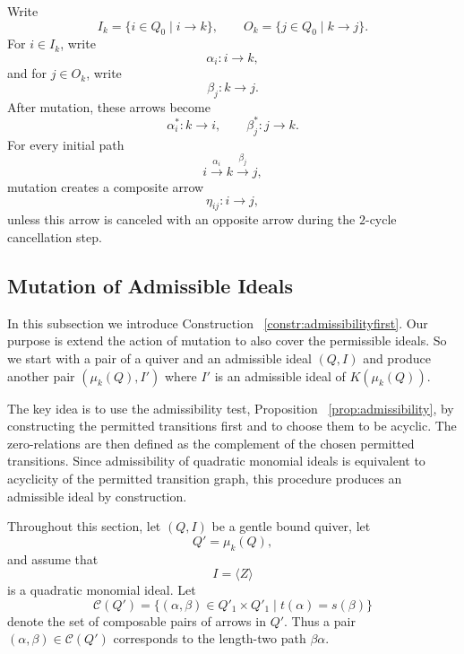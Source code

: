\documentclass[11pt]{article}
\theoremstyle{plain}
\theoremstyle{definition}
\theoremstyle{remark}
\begin{document}
Write
\[
  I_k=\{i\in Q_0\mid i\to k\},
  \qquad
  O_k=\{j\in Q_0\mid k\to j\}.
\]
For \(i\in I_k\), write
\[
  \alpha_i:i\to k,
\]
and for \(j\in O_k\), write
\[
  \beta_j:k\to j.
\]
After mutation, these arrows become
\[
  \alpha_i^*:k\to i,
  \qquad
  \beta_j^*:j\to k.
\]
For every initial path
\[
  i\xrightarrow{\alpha_i} k \xrightarrow{\beta_j} j,
\]
mutation creates a composite arrow
\[
  \eta_{ij}:i\to j,
\]
unless this arrow is canceled with an opposite arrow during the \(2\)-cycle
cancellation step.

\subsection{Mutation of Admissible Ideals}
\label{sec:admissibility-first-relation-mutation}

In this subsection we introduce  Construction ~\ref{constr:admissibilityfirst}. Our purpose is extend the action of mutation to also cover the permissible ideals. So we start with a pair of a quiver and an admissible ideal \((Q,I)\) and produce another pair \((\mu_{k}(Q),I')\) where \(I'\) is an admissible ideal of \(K(\mu_{k}(Q))\).

  The key idea is to use the admissibility test, Proposition ~\ref{prop:admissibility},  by constructing the permitted transitions
first and to choose them to be acyclic.  The zero-relations are then defined
as the complement of the chosen permitted transitions.  Since admissibility of
quadratic monomial ideals is equivalent to acyclicity of the permitted
transition graph, this procedure produces an admissible ideal by construction.

Throughout this section, let \((Q,I)\) be a gentle bound quiver, let
\[
  Q'=\mu_k(Q),
\]
and assume that
\[
  I=\langle Z\rangle
\]
is a quadratic monomial ideal.  Let
\[
  \mathcal C(Q')
  =
  \{(\alpha,\beta)\in Q'_1\times Q'_1
    \mid t(\alpha)=s(\beta)\}
\]
denote the set of composable pairs of arrows in \(Q'\).  Thus a pair
\((\alpha,\beta)\in \mathcal C(Q')\) corresponds to the length-two path
\(\beta\alpha\).
\end{document}
